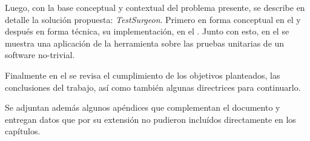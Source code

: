 \par Luego, con la base conceptual y contextual del problema presente, se describe en detalle la solución propuesta: \emph{TestSurgeon}. Primero en forma conceptual en el  y después en forma técnica, su implementación, en el . Junto con esto, en el  se muestra una aplicación de la herramienta sobre las pruebas unitarias de un software no-trivial. 

\par Finalmente en el  se revisa el cumplimiento de los objetivos planteados, las conclusiones del trabajo, así como también algunas directrices para continuarlo.

\par Se adjuntan además algunos apéndices que complementan el documento y entregan datos que por su extensión no pudieron incluídos directamente en los capítulos.
